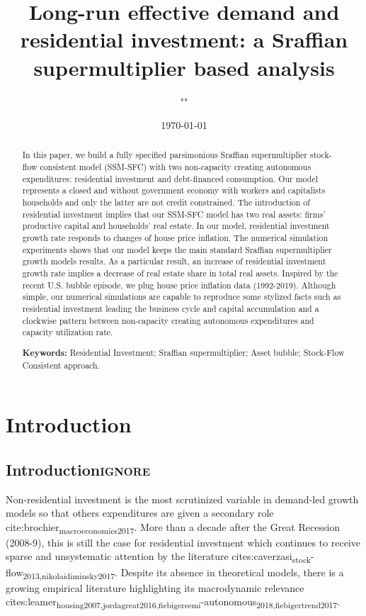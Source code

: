 \documentclass[12pt]{article}
\author{""}
\date{\today}
\title{Long-run effective demand and residential investment: a Sraffian supermultiplier based analysis}
\begin{document}
\maketitle
\begin{abstract}
In this paper, we build a fully specified parsimonious Sraffian supermultiplier stock-flow consistent model (SSM-SFC) with two non-capacity creating autonomous expenditures: residential investment and debt-financed consumption.
Our model represents a closed and without government economy with workers and capitalists households and only the latter are not credit constrained.
The introduction of residential investment implies that our SSM-SFC model has two real assets: firms' productive capital and households' real estate.
In our model, residential investment growth rate responds to changes of house price inflation.
The numerical simulation experiments shows that our model keeps the main standard Sraffian supermultiplier growth models results.
As a particular result, an increase of residential investment growth rate implies a decrease of real estate share in total real assets.
Inspired by the recent U.S. bubble episode, we plug house price inflation data (1992-2019).
Although simple, our numerical simulations are capable to reproduce some stylized facts such as residential investment leading the business cycle and capital accumulation and a clockwise pattern between non-capacity creating autonomous expenditures and capacity utilization rate.

\noindent \textbf{Keywords:} Residential Investment; Sraffian supermultiplier; Asset bubble;  Stock-Flow Consistent approach.
\end{abstract}

\doublespacing
\setlength{\parindent}{4em}
\setlength{\parskip}{1em}

\section{Introduction}
\label{sec:orgca000ec}
\label{sec:introduction}
\subsection{Introduction\hfill{}\textsc{ignore}}
\label{sec:org7957a00}

Non-residential investment is the most scrutinized variable in demand-led growth models so that others expenditures are given a secondary role cite:brochier\textsubscript{macroeconomics}\textsubscript{2017}.
More than a decade after the Great Recession (2008-9), this is still the case for residential investment which continues to receive sparse and unsystematic attention by the literature cites:caverzasi\textsubscript{stock}-flow\textsubscript{2013,nikolaidi}\textsubscript{minsky}\textsubscript{2017}.
Despite its absence in theoretical models, there is a growing empirical literature highlighting its macrodynamic relevance cites:leamer\textsubscript{housing}\textsubscript{2007,jorda}\textsubscript{great}\textsubscript{2016,fiebiger}\textsubscript{semi}-autonomous\textsubscript{2018,fiebiger}\textsubscript{trend}\textsubscript{2017}.
\end{document}
